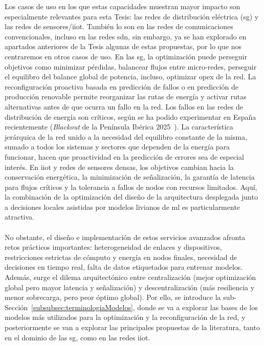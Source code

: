 Los casos de uso en los que estas capacidades muestran mayor impacto son especialmente relevantes para esta Tesis: las redes de distribución eléctrica (\gls{sg}) y las redes de sensores/\gls{iiot}. También lo son en las redes de comunicaciones convencionales, incluso en las redes \gls{sdn}, sin embargo, ya se han explorado en apartados anteriores de la Tesis algunas de estas propuestas, por lo que nos centraremos en otros casos de uso. En las \gls{sg}, la optimización puede perseguir objetivos como minimizar pérdidas, balancear flujos entre micro-redes, perseguir el equilibro del balance global de potencia, incluso, optimizar \gls{opex} de la red. La reconfiguración proactiva basada en predicción de fallos o en predicción de producción renovable permite reorganizar las rutas de energía y activar rutas alternativas antes de que ocurra un fallo en la red. Los fallos en las redes de distribución de energía son críticos, según se ha podido experimentar en España recientemente (\textit{Blackout} de la Península Ibérica 2025~\cite{iberianblackout}). La característica jerárquica de la red unido a la necesidad del equilibro constante de la misma, sumado a todos los sistemas y sectores que dependen de la energía para funcionar, hacen que proactividad en la predicción de errores sea de especial interés. En \gls{iiot} y redes de sensores densas, los objetivos cambian hacia la conservación energética, la minimización de señalización, la garantía de latencia para flujos críticos y la tolerancia a fallos de nodos con recursos limitados. Aquí, la combinación de la optimización del diseño de la arquitectura desplegada junto a decisiones locales asistidas por modelos livianos de \gls{ml} es particularmente atractiva.\\
\\
No obstante, el diseño e implementación de estos servicios avanzados afronta retos prácticos importantes: heterogeneidad de enlaces y dispositivos, restricciones estrictas de cómputo y energía en nodos finales, necesidad de decisiones en tiempo real, falta de datos etiquetados para entrenar modelos. Además, surge el dilema arquitectónico entre centralización (mejor optimización global pero mayor latencia y señalización) y descentralización (más resiliencia y menor sobrecarga, pero peor óptimo global). Por ello, se introduce la sub-Sección~\ref{subsubsec:terminologiaModelos}, donde se va a explorar las bases de los modelos más utilizados para la optimización y la reconfiguración de la red, y posteriormente se van a explorar las principales propuestas de la literatura, tanto en el dominio de las \gls{sg}, como en las redes \gls{iiot}.

